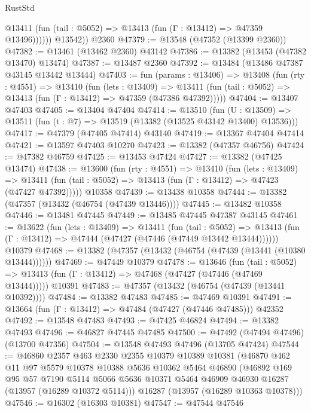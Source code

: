 \begin{lexlean}{RustStd}
\begin{coremodule}
              @13411 (fun (tail : @5052) => @13413 (fun (Γ : @13412) => @47359 @13496))))))
        @13542))
    @2360
@47379 := @13548 (@47352 (@13399 @2360))
@47382 := @13461 (@13462 @2360) @43142
@47386 := @13382 (@13453 (@47382 @13470) @13474)
@47387 := @13487 @2360
@47392 := @13484 (@13486 @47387 @43145 @13442 @13444)
@47403 := fun (params : @13406) =>
  @13408
    (fun (rty : @4551) =>
    @13410
      (fun (lets : @13409) =>
      @13411 (fun (tail : @5052) => @13413 (fun (Γ : @13412) => @47359 (@47386 @47392)))))
@47404 := @13407 @47403
@47405 := @13404 @47404
@47414 := @13510
    (fun (U : @13509) => @13511 (fun (t : @7) => @13519 (@13382 (@13525 @43142 @13400) @13536)))
@47417 := @47379 (@47405 @47414) @43140
@47419 := @13367 @47404 @47414
@47421 := @13597 @47403 @10270
@47423 := @13382 (@47357 @46756)
@47424 := @47382 @46759
@47425 := @13453 @47424
@47427 := @13382 (@47425 @13474)
@47438 := @13600
    (fun (rty : @4551) =>
    @13410
      (fun (lets : @13409) =>
      @13411 (fun (tail : @5052) => @13413 (fun (Γ : @13412) => @47423 (@47427 @47392)))))
    @10358
@47439 := @13438 @10358
@47444 := @13382 (@47357 (@13432 (@46754 (@47439 @13446))))
@47445 := @13482 @10358
@47446 := @13481 @47445
@47449 := @13485 @47445 @47387 @43145
@47461 := @13622
    (fun (lets : @13409) =>
    @13411
      (fun (tail : @5052) =>
      @13413 (fun (Γ : @13412) => @47444 (@47427 (@47446 (@47449 @13442 @13444))))))
    @10379
@47468 := @13382 (@47357 (@13432 (@46754 (@47439 (@13441 (@10380 @13444))))))
@47469 := @47449 @10379
@47478 := @13646
    (fun (tail : @5052) => @13413 (fun (Γ : @13412) => @47468 (@47427 (@47446 (@47469 @13444)))))
    @10391
@47483 := @47357 (@13432 (@46754 (@47439 (@13441 @10392))))
@47484 := @13382 @47483
@47485 := @47469 @10391
@47491 := @13664 (fun (Γ : @13412) => @47484 (@47427 (@47446 @47485))) @42352
@47492 := @13548 @47483
@47493 := @47425 @46824
@47494 := @13382 @47493
@47496 := @46827 @47445 @47485
@47500 := @47492 (@47494 @47496) (@13700 @47356)
@47504 := @13548 @47493 @47496 (@13705 @47424)
@47544 := @46860
    @2357
    @463
    @2330
    @2355
    @10379
    @10389
    @10381
    (@46870
      @462
      @11
      @97
      @5579
      @10378
      @10388
      @5636
      @10362
      @5464
      @46890
      (@46892
        @169
        @95
        @57
        @7190
        @5114
        @5066
        @5636
        @10371
        @5464
        @46909
        @46930
        @16287
        (@13957 (@16289 @10372 @5114)))
      @16287
      (@13957 (@16289 @10363 @10378)))
@47546 := @16302 (@16303 @10381)
@47547 := @47544 @47546

\end{coremodule}
\end{lexlean}
